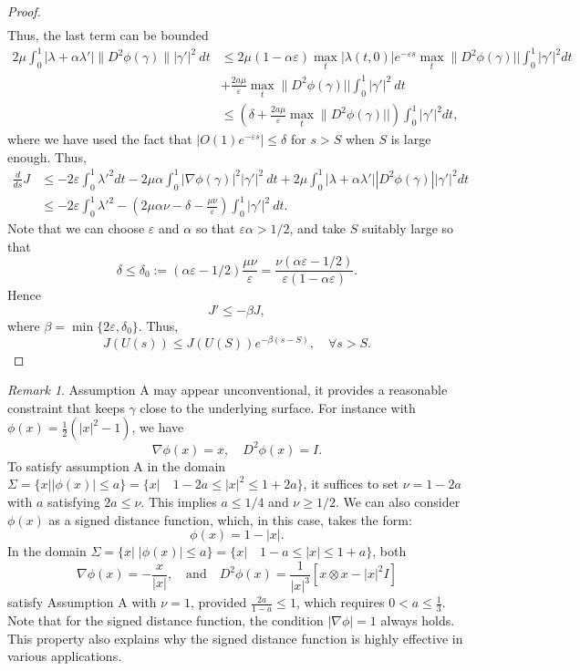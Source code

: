 \documentclass[12pt]{amsart}
\theoremstyle{definition}
\theoremstyle{remark}
\newtheorem{remark}[theorem]{Remark}
\numberwithin{equation}{section}
\numberwithin{equation}{section}
\begin{document}
\begin{proof}
\begin{align*}
\end{align*} 
Thus, the last term can be bounded
\begin{align*}
    2\mu\int_0^1 |\lambda + \alpha \lambda'|\|D^2 \phi(\gamma) \| |\gamma'|^2 ~dt & \leq  2\mu  (1-\alpha\varepsilon) \max_t |\lambda(t,0)|e^{-\varepsilon s} \max_t \|D^2 \phi(\gamma)||\int_0^1 |\gamma'|^2 dt \\
    &  + \frac{2a\mu}{\varepsilon} \max_t \|D^2 \phi(\gamma)||  \int_0^1  |\gamma'|^2~dt\\
    & \leq \left( \delta +  \frac{2a \mu}{\varepsilon} \max_t \|D^2 \phi(\gamma)||   \right)  \int_0^1 |\gamma'|^2 dt,
\end{align*}
where we have used the fact that $|O(1)e^{-\varepsilon s}| \leq \delta$ for $s>S$ when $S$ is large enough. Thus,
\begin{align*}
    \frac{d}{ds} J & 
    \leq  -2 \varepsilon \int_0^1\lambda'^2dt -2\mu\alpha  \int_0^1 |\nabla \phi(\gamma)|^2 |\gamma'|^2~dt + 2\mu \int_0^1 
    |\lambda +\alpha \lambda'| |D^2\phi(\gamma)||\gamma'|^2 dt \\
    & \leq  -2\varepsilon \int_0^1\lambda'^2 
    - (  2 \mu \alpha \nu - \delta - \frac{\mu \nu}{\varepsilon} )  
    \int_0^1 |\gamma'|^2~dt. 
\end{align*}
Note that we can choose $\varepsilon$ and $\alpha$ so that 
$\varepsilon \alpha >1/2$, and take $S$ suitably large  so that 
$$
\delta \leq  \delta_0:= 
(\alpha \varepsilon -1/2)\frac{\mu \nu}{\varepsilon}=\frac{\nu(\alpha \varepsilon -1/2)}{\varepsilon (1- \alpha \varepsilon)}.
$$
Hence 
$$
J' \leq -\beta J,  
$$
where $\beta = \min\{2\varepsilon, \delta_0 \}$. Thus,
$$
J(U(s))\leq J(U(S))e^{-\beta (s-S)}, \quad \forall s>S.
$$
\end{proof} 
\begin{remark}
Assumption A may appear unconventional, it provides  a reasonable constraint that keeps $\gamma$ close to the underlying surface. 
{ For instance with $\phi(x)=\frac{1}{2}(|x|^2-1)$, we have 
$$
\nabla \phi(x)=x, \quad D^2\phi(x)=I.
$$
To satisfy assumption A  
in the domain $\Sigma=\{x| |\phi(x)|\leq a\}=\{x|\quad 1-2a \leq |x|^2 \leq 1+2a \}$, it suffices to set 
$\nu=1-2a$ with $a$
satisfying $2a \leq \nu$. This implies $a \leq 1/4$ and $\nu \geq 1/2.$ 
We can also consider $\phi(x)$ as a signed distance function, which,  in this case, takes  the form:  
$$
\phi(x)=1- |x|.
$$
In the domain $\Sigma=\{x| \; |\phi(x)|\leq a\}=\{x|\quad 1-a\leq |x|\leq 1+a\}$, both 
$$
\nabla \phi(x)=-\frac{x}{|x|}, \quad \text{and} \quad  D^2\phi(x)=\frac{1}{|x|^3}\left[
x\otimes x -|x|^2I
\right] 
$$
 satisfy Assumption A with $\nu=1$, provided   $\frac{2a}{1-a}\leq 1$, which requires $0< a\leq \frac{1}{3}$. Note that for the signed distance function, the condition $|\nabla \phi|=1$ always holds. This property also explains why the signed distance function is highly effective in various  applications. 
 }
\end{remark} 
\end{document}
